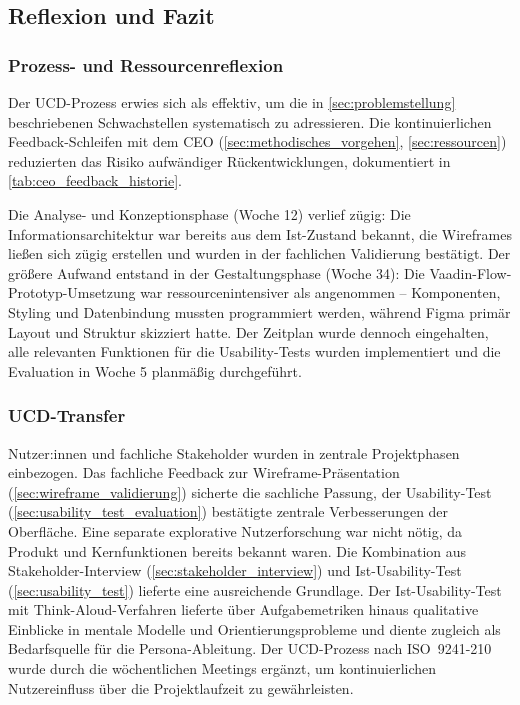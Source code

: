 \subsection{Reflexion und Fazit}\label{sec:reflexion_fazit}

\subsubsection{Prozess- und Ressourcenreflexion}

Der UCD-Prozess erwies sich als effektiv, um die in \autoref{sec:problemstellung} beschriebenen Schwachstellen systematisch zu adressieren. Die kontinuierlichen Feedback-Schleifen mit dem CEO (\autoref{sec:methodisches_vorgehen}, \autoref{sec:ressourcen}) reduzierten das Risiko aufwändiger Rückentwicklungen, dokumentiert in \autoref{tab:ceo_feedback_historie}.

Die Analyse- und Konzeptionsphase (Woche 1\textendash{}2) verlief zügig: Die Informationsarchitektur war bereits aus dem Ist-Zustand bekannt, die Wireframes ließen sich zügig erstellen und wurden in der fachlichen Validierung bestätigt. Der größere Aufwand entstand in der Gestaltungsphase (Woche 3\textendash{}4): Die Vaadin-Flow-Prototyp-Umsetzung war ressourcenintensiver als angenommen -- Komponenten, Styling und Datenbindung mussten programmiert werden, während Figma primär Layout und Struktur skizziert hatte. Der Zeitplan wurde dennoch eingehalten, alle relevanten Funktionen für die Usability-Tests wurden implementiert und die Evaluation in Woche 5 planmäßig durchgeführt.

\subsubsection{UCD-Transfer}

Nutzer:innen und fachliche Stakeholder wurden in zentrale Projektphasen einbezogen. Das fachliche Feedback zur Wireframe-Präsentation (\autoref{sec:wireframe_validierung}) sicherte die sachliche Passung, der Usability-Test (\autoref{sec:usability_test_evaluation}) bestätigte zentrale Verbesserungen der Oberfläche. Eine separate explorative Nutzerforschung war nicht nötig, da Produkt und Kernfunktionen bereits bekannt waren. Die Kombination aus Stakeholder-Interview (\autoref{sec:stakeholder_interview}) und Ist-Usability-Test (\autoref{sec:usability_test}) lieferte eine ausreichende Grundlage. Der Ist-Usability-Test mit Think-Aloud-Verfahren lieferte über Aufgabemetriken hinaus qualitative Einblicke in mentale Modelle und Orientierungsprobleme und diente zugleich als Bedarfsquelle für die Persona-Ableitung. Der UCD-Prozess nach ISO~9241-210 \parencite{iso_9241_210} wurde durch die wöchentlichen Meetings ergänzt, um kontinuierlichen Nutzereinfluss über die Projektlaufzeit zu gewährleisten.

